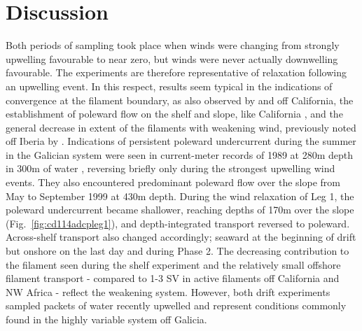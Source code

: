 \section{Discussion}
Both periods of sampling took place when winds were changing from
strongly upwelling favourable to near zero, but winds were never
actually downwelling favourable. The experiments are therefore
representative of relaxation following an upwelling event.  In
this respect, results seem typical in the indications of
convergence at the filament boundary, as also observed by
\citet{Flament85} and \citet{Flament00} off California, the
establishment of poleward flow on the shelf and slope, like
California \citep{Winant87}, and the general decrease in extent of
the filaments with weakening wind, previously noted off Iberia by
\citet{Haynes93}. Indications of persistent poleward undercurrent
during the summer in the Galician system were seen in
current-meter records of 1989 at 280m depth in 300m of water
\citep{Huthnance02}, reversing briefly only during the strongest
upwelling wind events. They also encountered predominant poleward
flow over the slope from May to September 1999 at 430m depth.
During the wind relaxation of Leg 1, the poleward undercurrent
became shallower, reaching depths of 170m over the slope
(Fig.~\ref{fig:cd114adcpleg1}), and depth-integrated transport
reversed to poleward. Across-shelf transport also changed
accordingly; seaward at the beginning of drift but onshore on the
last day and during Phase 2. The decreasing contribution to the
filament seen during the shelf experiment and the relatively small
offshore filament transport - compared to 1-3 SV in active
filaments off California \citep{Strub91} and NW Africa
\citep{Barton98} - reflect the weakening system.  However, both
drift experiments sampled packets of water recently upwelled and
represent conditions commonly found in the highly variable system
off Galicia.

